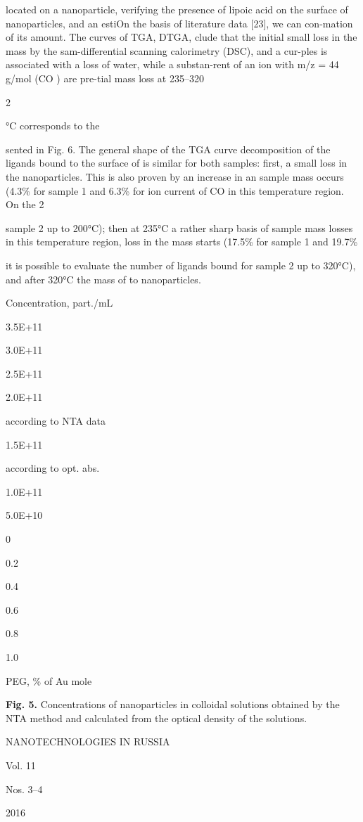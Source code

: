 \documentclass[12pt,a4paper]{article}
\begin{document}
located on a nanoparticle, verifying the presence of lipoic acid on the
surface of nanoparticles, and an estiOn the basis of literature data
{[}23{]}, we can con-mation of its amount. The curves of TGA, DTGA,
clude that the initial small loss in the mass by the sam-differential
scanning calorimetry (DSC), and a cur-ples is associated with a loss of
water, while a substan-rent of an ion with m/z = 44 g/mol (CO ) are
pre-tial mass loss at 235--320

2

°C corresponds to the

sented in Fig. 6. The general shape of the TGA curve decomposition of
the ligands bound to the surface of is similar for both samples: first,
a small loss in the nanoparticles. This is also proven by an increase in
an sample mass occurs (4.3\% for sample 1 and 6.3\% for ion current of
CO in this temperature region. On the 2

sample 2 up to 200°C); then at 235°C a rather sharp basis of sample mass
losses in this temperature region, loss in the mass starts (17.5\% for
sample 1 and 19.7\%

it is possible to evaluate the number of ligands bound for sample 2 up
to 320°C), and after 320°C the mass of to nanoparticles.

Concentration, part./mL

3.5E+11

3.0E+11

2.5E+11

2.0E+11

according to NTA data

1.5E+11

according to opt. abs.

1.0E+11

5.0E+10

0

0.2

0.4

0.6

0.8

1.0

PEG, \% of Au mole

\textbf{Fig. 5.} Concentrations of nanoparticles in colloidal solutions
obtained by the NTA method and calculated from the optical density of
the solutions.

NANOTECHNOLOGIES IN RUSSIA

Vol. 11

Nos. 3--4

2016
\end{document}
